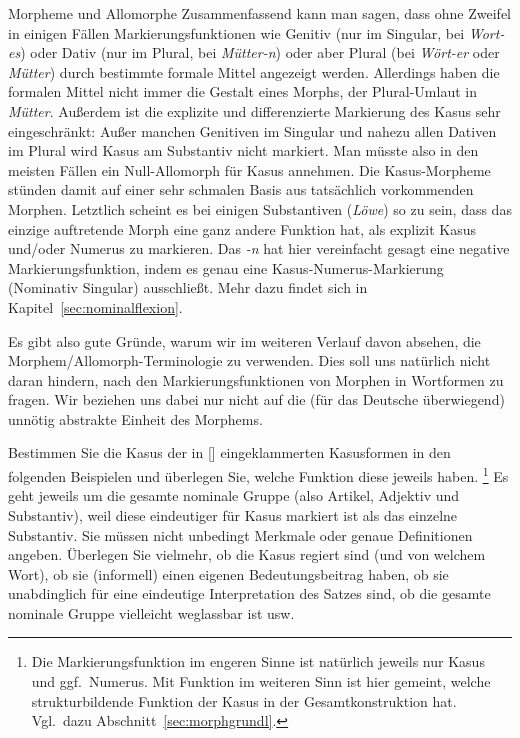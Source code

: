 \begin{Vertiefung}{Morpheme und Allomorphe}
Zusammenfassend kann man sagen, dass ohne Zweifel in einigen Fällen Markierungsfunktionen wie Genitiv (nur im Singular, \zB bei \textit{Wort-es}) oder Dativ (nur im Plural, \zB bei \textit{Mütter-n}) oder aber Plural (\zB bei \textit{Wört-er} oder \textit{Mütter}) durch bestimmte formale Mittel angezeigt werden.
Allerdings haben die formalen Mittel nicht immer die Gestalt eines Morphs, \zB der Plural-Umlaut in \textit{Mütter}.
Außerdem ist die explizite und differenzierte Markierung des Kasus sehr eingeschränkt:
Außer manchen Genitiven im Singular und nahezu allen Dativen im Plural wird Kasus am Substantiv nicht markiert.
Man müsste also in den meisten Fällen ein Null-Allomorph für Kasus annehmen.
Die Kasus-Morpheme stünden damit auf einer sehr schmalen Basis aus tatsächlich vorkommenden Morphen.
Letztlich scheint es bei einigen Substantiven (\zB \textit{Löwe}) so zu sein, dass das einzige auftretende Morph eine ganz andere Funktion hat, als explizit Kasus und\slash oder Numerus zu markieren.
Das \textit{-n} hat hier vereinfacht gesagt eine negative Markierungsfunktion, indem es genau eine Kasus-Numerus-Markierung (Nominativ Singular) ausschließt.
Mehr dazu findet sich in Kapitel~\ref{sec:nominalflexion}.

Es gibt also gute Gründe, warum wir im weiteren Verlauf davon absehen, die Morphem\slash Allomorph-Terminologie zu verwenden.
Dies soll uns natürlich nicht daran hindern, nach den Markierungsfunktionen von Morphen in Wortformen zu fragen.
Wir beziehen uns dabei nur nicht auf die (für das Deutsche überwiegend) unnötig abstrakte Einheit des Morphems.

\end{Vertiefung}

\Uebungen

\Uebung[\tristar] \label{u61} Bestimmen Sie die Kasus der in [] eingeklammerten Kasusformen in den folgenden Beispielen und überlegen Sie, welche Funktion diese jeweils haben.%
\footnote{Die Markierungsfunktion im engeren Sinne ist natürlich jeweils nur Kasus und ggf.\ Numerus.
Mit Funktion im weiteren Sinn ist hier gemeint, welche strukturbildende Funktion der Kasus in der Gesamtkonstruktion hat.
Vgl.\ dazu Abschnitt~\ref{sec:morphgrundl}.}
Es geht jeweils um die gesamte nominale Gruppe (also Artikel, Adjektiv und Substantiv), weil diese eindeutiger für Kasus markiert ist als das einzelne Substantiv.
Sie müssen nicht unbedingt Merkmale oder genaue Definitionen angeben.
Überlegen Sie vielmehr, ob die Kasus regiert sind (und von welchem Wort), ob sie (informell) einen eigenen Bedeutungsbeitrag haben, ob sie unabdinglich für eine eindeutige Interpretation des Satzes sind, ob die gesamte nominale Gruppe vielleicht weglassbar ist usw.

